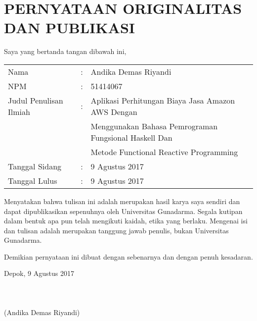 \documentclass[pi.tex]{subfile}
\begin{document}
\chapter*{PERNYATAAN ORIGINALITAS DAN PUBLIKASI}

Saya yang bertanda tangan dibawah ini,

\begin{tabular}{lcl}
  Nama &:& Andika Demas Riyandi \\
  NPM &:& 51414067 \\
  Judul Penulisan Ilmiah &:& Aplikasi Perhitungan Biaya Jasa Amazon AWS Dengan \\ & & Menggunakan Bahasa Pemrograman Fungsional Haskell Dan \\ & & Metode Functional Reactive Programming \\
  Tanggal Sidang &:& 9 Agustus 2017 \\
  Tanggal Lulus &:& 9 Agustus 2017 \\
\end{tabular}

Menyatakan bahwa tulisan ini adalah merupakan hasil karya saya sendiri dan dapat dipublikasikan sepenuhnya oleh Universitas Gunadarma. Segala kutipan dalam bentuk apa pun telah mengikuti kaidah, etika yang berlaku. Mengenai isi dan tulisan adalah merupakan tanggung jawab penulis, bukan Universitas Gunadarma. 

Demikian pernyataan ini dibuat dengan sebenarnya dan dengan penuh kesadaran.


Depok, 9 Agustus 2017
\\
\\
\\
\\
(Andika Demas Riyandi)
\end{document}
